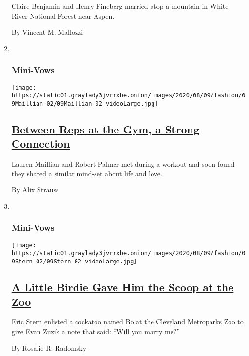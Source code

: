 \begin{enumerate}
  Claire Benjamin and Henry Fineberg married atop a mountain in White
  River National Forest near Aspen.

  By Vincent M. Mallozzi
\item ~
  \hypertarget{mini-vows-1}{%
  \subsubsection{Mini-Vows}\label{mini-vows-1}}

  \texttt{[image: https://static01.graylady3jvrrxbe.onion/images/2020/08/09/fashion/09Maillian-02/09Maillian-02-videoLarge.jpg]}

  \hypertarget{between-reps-at-the-gym-a-strong-connection}{%
  \subsection{\texorpdfstring{\href{/2020/08/07/fashion/weddings/between-reps-at-the-gym-a-strong-connection.html}{Between
  Reps at the Gym, a Strong
  Connection}}{Between Reps at the Gym, a Strong Connection}}\label{between-reps-at-the-gym-a-strong-connection}}

  Lauren Maillian and Robert Palmer met during a workout and soon found
  they shared a similar mind-set about life and love.

  By Alix Strauss
\item ~
  \hypertarget{mini-vows-2}{%
  \subsubsection{Mini-Vows}\label{mini-vows-2}}

  \texttt{[image: https://static01.graylady3jvrrxbe.onion/images/2020/08/09/fashion/09Stern-02/09Stern-02-videoLarge.jpg]}

  \hypertarget{a-little-birdie-gave-him-the-scoop-at-the-zoo}{%
  \subsection{\texorpdfstring{\href{/2020/08/07/fashion/weddings/a-little-birdie-gave-him-the-scoop-at-the-zoo.html}{A
  Little Birdie Gave Him the Scoop at the
  Zoo}}{A Little Birdie Gave Him the Scoop at the Zoo}}\label{a-little-birdie-gave-him-the-scoop-at-the-zoo}}

  Eric Stern enlisted a cockatoo named Bo at the Cleveland Metroparks
  Zoo to give Evan Zuzik a note that said: ``Will you marry me?''

  By Rosalie R. Radomsky
\end{enumerate}

